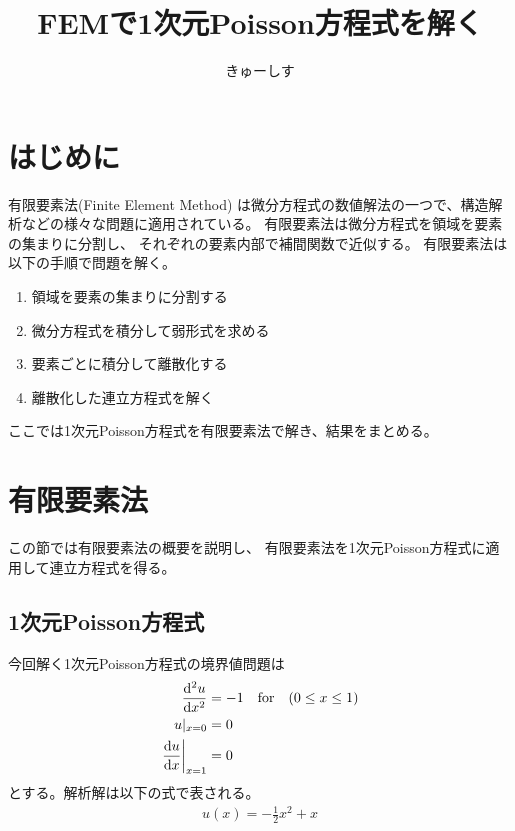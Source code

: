 \documentclass[paper=a4]{jlreq}
\begin{document}
\title{FEMで1次元Poisson方程式を解く}
\author{きゅーしす}
\maketitle

\section{はじめに}

有限要素法(Finite Element Method)
は微分方程式の数値解法の一つで、構造解析などの様々な問題に適用されている。
有限要素法は微分方程式を領域を要素の集まりに分割し、
それぞれの要素内部で補間関数で近似する。
有限要素法は以下の手順で問題を解く。
\begin{enumerate}
    \item 領域を要素の集まりに分割する
    \item 微分方程式を積分して弱形式を求める
    \item 要素ごとに積分して離散化する
    \item 離散化した連立方程式を解く
\end{enumerate}

ここでは1次元Poisson方程式を有限要素法で解き、結果をまとめる。

\section{有限要素法}
この節では有限要素法の概要を説明し、
有限要素法を1次元Poisson方程式に適用して連立方程式を得る。

\subsection{1次元Poisson方程式}
今回解く1次元Poisson方程式の境界値問題は
\begin{align}
    \begin{aligned}
        \dv[2]{u}{x} &= -1 \quad \mathrm{for}\quad (0 \leq x \leq 1)\\
        u|_{x=0} &= 0\\
        \eval{\dv{u}{x}}_{x=1} &= 0
    \end{aligned}
    \label{eq:gov}
\end{align}
とする。解析解は以下の式で表される。
\begin{align}
    u(x) = -\frac{1}{2}x^2+x
\end{align}
\end{document}
